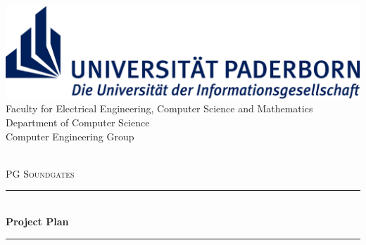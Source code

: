 \newcommand{\HRule}{\rule{\linewidth}{0.5mm}}

\begin{titlepage}

\begin{center}


\begin{minipage}{\linewidth}
	\includegraphics[width=\textwidth]{./images/UPB_Logo_RGB_12}
    \textsf
    {
    	\hspace*{2.6cm} Faculty for Electrical Engineering, Computer Science and Mathematics\\
        \hspace*{2.6cm} Department of Computer Science\\
        \hspace*{2.6cm} Computer Engineering Group \\
    }
\end{minipage}\\[2.2cm]

\textsc{\LARGE PG Soundgates}\\[2.2cm]


\HRule \\[0.4cm]
{\huge \bfseries Project Plan}\\[0.0cm]
\HRule \\[0.4cm]


\end{center}
\end{titlepage}
